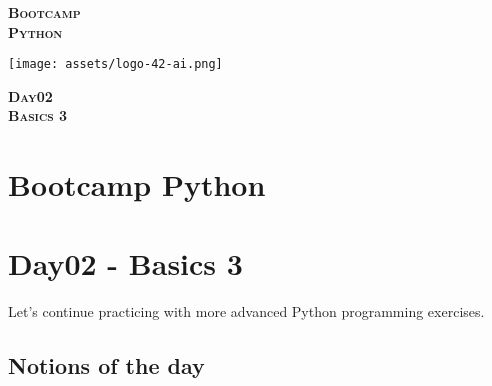 \documentclass[]{article}
\date{}
\begin{document}

\vspace*{2cm}
\begin{center}
    \textsc{\fontsize{40}{48} \bfseries Bootcamp}\\[0.6cm]
    \textsc{\fontsize{39}{48} \bfseries { %
Python
    }}\\[0.3cm]
\end{center}
\vspace{3cm}

\begin{center}
\texttt{[image: assets/logo-42-ai.png]}{\centering}
\end{center}

\vspace*{2cm}
\begin{center}
    \textsc{\fontsize{32}{48} \bfseries %
Day02    
    }\\[0.6cm]
    \textsc{\fontsize{32}{48} \bfseries %
Basics 3    
    }\\[0.3cm]
\end{center}
\vspace{3cm}

\newpage

\setcounter{page}{1}



\hypertarget{bootcamp-python}{%
\section{Bootcamp Python}\label{bootcamp-python}}

\hypertarget{day02---basics-3}{%
\section{Day02 - Basics 3}\label{day02---basics-3}}

Let's continue practicing with more advanced Python programming
exercises.

\hypertarget{notions-of-the-day}{%
\subsection{Notions of the day}\label{notions-of-the-day}}
\end{document}
